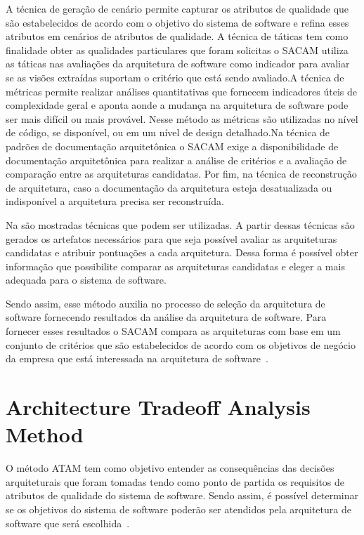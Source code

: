A técnica de geração de cenário permite capturar  os atributos de qualidade que são estabelecidos de acordo com o objetivo do sistema de software  e refina esses atributos em cenários de atributos de qualidade. A técnica de táticas tem como finalidade  obter as qualidades particulares que foram solicitas o \acrfull{SACAM} utiliza as táticas nas avaliações da arquitetura de software como indicador para avaliar se as visões extraídas suportam o critério que está sendo avaliado.A técnica de métricas permite realizar análises quantitativas que fornecem indicadores úteis de complexidade geral e aponta aonde a mudança na arquitetura de software pode ser mais difícil ou mais provável. Nesse método as métricas são utilizadas no nível de código, se disponível, ou em um nível de design detalhado.Na técnica de padrões de documentação arquitetônica o \acrfull{SACAM} exige a disponibilidade de documentação arquitetônica para realizar a análise de critérios e a avaliação de comparação entre as arquiteturas candidatas. Por fim, na técnica de reconstrução de arquitetura, caso a documentação da arquitetura esteja desatualizada ou indisponível a arquitetura precisa ser reconstruída. 

%

Na  são mostradas  técnicas que podem ser utilizadas. A partir dessas técnicas são gerados os artefatos necessários para que seja possível avaliar as arquiteturas candidatas e atribuir pontuações a cada arquitetura. Dessa forma é possível obter informação que possibilite comparar as arquiteturas candidatas e eleger a mais adequada para o sistema de software. 

Sendo assim, esse método auxilia no processo de seleção da arquitetura de software fornecendo resultados da análise da arquitetura de software. Para fornecer esses resultados o SACAM compara as arquiteturas com base em um conjunto de critérios que são estabelecidos de acordo com os objetivos de negócio da empresa que está interessada na arquitetura de software~\cite{SACAM}. 

\section{Architecture Tradeoff Analysis Method}

O método \acrfull{ATAM} tem como objetivo entender as consequências das decisões arquiteturais que foram tomadas tendo como ponto de partida os requisitos de atributos de qualidade do sistema de software. Sendo assim, é possível determinar se os objetivos do sistema de software poderão ser atendidos pela arquitetura de software que será escolhida~\cite{ATAM}. 

